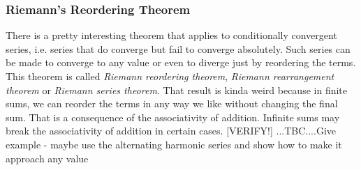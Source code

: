 

\subsubsection{Riemann's Reordering Theorem} There is a pretty interesting theorem that applies to conditionally convergent series, i.e. series that do converge but fail to converge absolutely. Such series can be made to converge to any value or even to diverge just by reordering the terms. This theorem is called \emph{Riemann reordering theorem}, \emph{Riemann rearrangement theorem} or \emph{Riemann series theorem}. That result is kinda weird because in finite sums, we can reorder the terms in any way we like without changing the final sum. That is a consequence of the associativity of addition. Infinite sums may break the associativity of addition in certain cases. [VERIFY!] ...TBC....Give example - maybe use the alternating harmonic series and show how to make it approach any value






